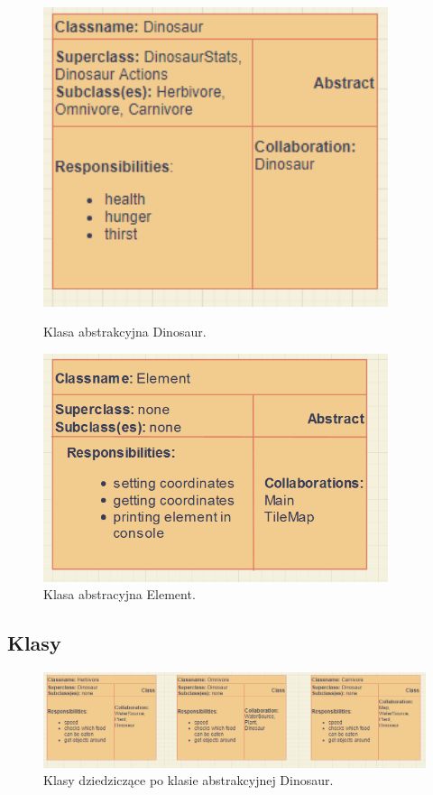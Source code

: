 \begin{figure}[h!]
    \centering
    \begin{minipage}{0.45\textwidth}
        \centering
        \includegraphics[width=0.9\textwidth]{images/crc/abs.png} %
        \caption{Klasa abstrakcyjna Dinosaur.}
    \end{minipage}\hfill
    \begin{minipage}{0.45\textwidth}
        \centering
        \includegraphics[width=0.9\textwidth]{images/crc/crc_element.png} %
        \caption{Klasa abstracyjna Element.}
    \end{minipage}
\end{figure}

\newpage
\subsection{Klasy}
\begin{figure}[h!]
    \centering
    \includegraphics[scale=0.75]{images/crc/dinosaur_types.png}
    \caption{Klasy dziedziczące po klasie abstrakcyjnej Dinosaur.}
    \label{fig:klasa1}
\end{figure}

